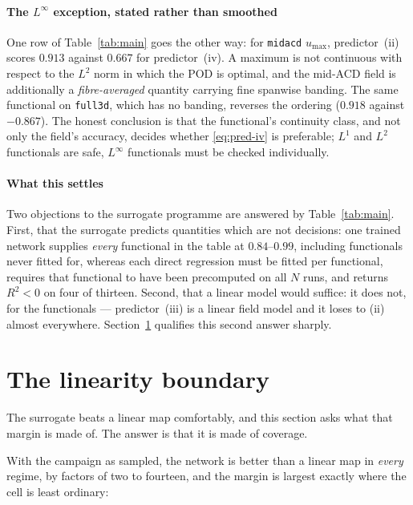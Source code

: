 \documentclass[11pt,a4paper]{article}
\theoremstyle{plain}
\theoremstyle{definition}
\theoremstyle{remark}
\begin{document}
\label{rem:linf}
\paragraph{The $L^\infty$ exception, stated rather than smoothed}
One row of Table~\ref{tab:main} goes the other way: for \texttt{midacd}
$u_{\max}$, predictor~(ii) scores $0.913$ against $0.667$ for predictor~(iv).
A maximum is not continuous with respect to the $L^2$
norm in which the POD is optimal, and the mid-ACD field is additionally a
\emph{fibre-averaged} quantity carrying fine spanwise banding. The same
functional on \texttt{full3d}, which has no banding, reverses the ordering
($0.918$ against $-0.867$). The honest conclusion is that the functional's
continuity class, and not only the field's accuracy, decides whether
\eqref{eq:pred-iv} is preferable; $L^1$ and $L^2$ functionals are safe, $L^\infty$
functionals must be checked individually.

\paragraph{What this settles}
Two objections to the surrogate programme are answered by
Table~\ref{tab:main}. First, that the surrogate predicts quantities which are
not decisions: one trained network supplies \emph{every} functional in the table
at $0.84$--$0.99$, including functionals never fitted for, whereas each direct
regression must be fitted per functional, requires that functional to have been
precomputed on all $N$ runs, and returns $R^2<0$ on four of thirteen. Second,
that a linear model would suffice: it does not, for the functionals ---
predictor~(iii) is a linear field model and it loses to (ii) almost everywhere.
Section~\ref{sec:boundary} qualifies this second answer sharply.

\section{The linearity boundary}
\label{sec:boundary}

The surrogate beats a linear map comfortably, and this section asks what that
margin is made of. The answer is that it is made of coverage.

With the campaign as sampled, the network is better than a linear map in
\emph{every} regime, by factors of two to fourteen, and the margin is largest
exactly where the cell is least ordinary:
\end{document}
